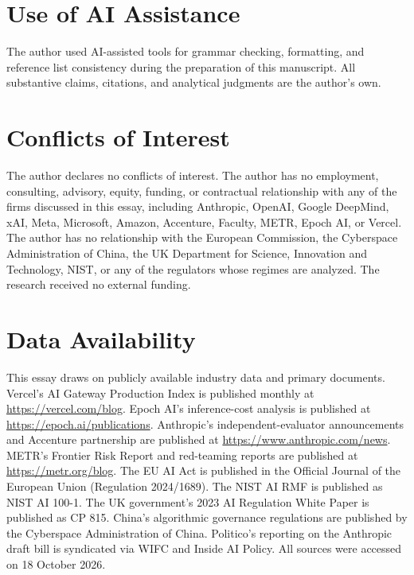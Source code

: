 
\section*{Use of AI Assistance}

The author used AI-assisted tools for grammar checking, formatting, and reference list consistency during the preparation of this manuscript. All substantive claims, citations, and analytical judgments are the author's own.

\section*{Conflicts of Interest}

The author declares no conflicts of interest. The author has no employment, consulting, advisory, equity, funding, or contractual relationship with any of the firms discussed in this essay, including Anthropic, OpenAI, Google DeepMind, xAI, Meta, Microsoft, Amazon, Accenture, Faculty, METR, Epoch AI, or Vercel. The author has no relationship with the European Commission, the Cyberspace Administration of China, the UK Department for Science, Innovation and Technology, NIST, or any of the regulators whose regimes are analyzed. The research received no external funding.

\section*{Data Availability}

This essay draws on publicly available industry data and primary documents. Vercel's AI Gateway Production Index is published monthly at \url{https://vercel.com/blog}. Epoch AI's inference-cost analysis is published at \url{https://epoch.ai/publications}. Anthropic's independent-evaluator announcements and Accenture partnership are published at \url{https://www.anthropic.com/news}. METR's Frontier Risk Report and red-teaming reports are published at \url{https://metr.org/blog}. The EU AI Act is published in the Official Journal of the European Union (Regulation 2024/1689). The NIST AI RMF is published as NIST AI 100-1. The UK government's 2023 AI Regulation White Paper is published as CP 815. China's algorithmic governance regulations are published by the Cyberspace Administration of China. Politico's reporting on the Anthropic draft bill is syndicated via WIFC and Inside AI Policy. All sources were accessed on 18 October 2026.

